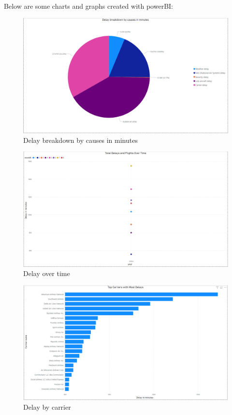 \documentclass[12pt,a4paper]{article}
\begin{document}
Below are some charts and graphs created with powerBI:
\begin{figure}[H]
    \begin{center}
        \includegraphics[width=\textwidth]{Images/chart1.png}
        \newline
        \caption{Delay breakdown by causes in minutes}
    \end{center}
\end{figure}
\begin{figure}[H]
    \begin{center}
        \includegraphics[width=\textwidth]{Images/chart2.png}
        \newline
        \caption{Delay over time}
    \end{center}
\end{figure}
\begin{figure}[H]
    \begin{center}
        \includegraphics[width=\textwidth]{Images/chart3.png}
        \newline
        \caption{Delay by carrier}
    \end{center}
\end{figure}
\end{document}

